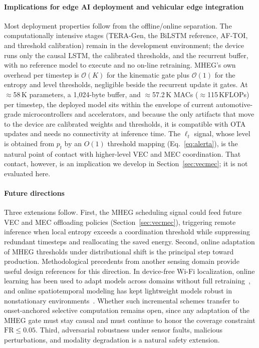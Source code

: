 \documentclass[a4paper,fleqn]{cas-dc}
\newcommand{\TERAGen}{\mbox{TERA-Gen}\xspace}
\newcommand{\AFTOI}{\mbox{AF-TOI}\xspace}
\newcommand{\MHEG}{\mbox{MHEG}\xspace}
\begin{document}
\paragraph{Implications for edge AI deployment and vehicular edge integration}
Most deployment properties follow from the offline/online separation. The computationally intensive stages (\TERAGen, the BiLSTM reference, \AFTOI, and threshold calibration) remain in the development environment; the device runs only the causal LSTM, the
calibrated thresholds, and the recurrent buffer, with no reference model to execute
and no on-line retraining. {\color{\revcolor}\MHEG's own overhead per timestep is
$\mathcal{O}(K)$ for the kinematic gate plus $\mathcal{O}(1)$ for the entropy
and level thresholds, negligible beside the recurrent update it gates.} At $\approx$58\,K parameters, a 1,024-byte
buffer, and {\color{\revcolor}$\approx$57.2\,K MACs ($\approx$115\,KFLOPs) per
timestep}, the deployed model sits within the
envelope of current automotive-grade microcontrollers and accelerators, and because
the only artifacts that move to the device are calibrated weights and thresholds, it
is compatible with OTA updates and needs no connectivity at inference time. The
$\ell_t$ signal{\color{\revcolor}, whose level is obtained from $p_t$ by an $O(1)$
threshold mapping (Eq.~\ref{eq:alerta}),} is the natural point of contact with
higher-level VEC and MEC coordination. That contact, however, is an implication
we develop in Section~\ref{sec:vecmec}; it is not evaluated here.
\paragraph{Future directions}
Three extensions follow. First, the \MHEG scheduling signal could feed future VEC
and MEC offloading policies (Section~\ref{sec:vecmec}), triggering remote
inference when local entropy exceeds a coordination threshold while suppressing
redundant timesteps and reallocating the saved energy. Second, online adaptation
of \MHEG thresholds under distributional shift is the principal step toward
production. {\color{\revcolor}Methodological precedents from another sensing
domain provide useful design references for this direction. In device-free \mbox{Wi-Fi}
localization, online learning has been used to adapt models across domains
without full retraining~\cite{zhang2025leveraging}, and online spatiotemporal
modeling has kept lightweight models robust in nonstationary
environments~\cite{zhang2023spatiotemporal}. Whether such incremental schemes
transfer to onset-anchored selective computation remains open, since any
adaptation of the \MHEG gate must stay causal and must continue to honor the
coverage constraint $\mathrm{FR}\le0.05$.} Third, adversarial robustness under sensor faults, malicious
perturbations, and modality degradation is a natural safety extension.
\end{document}
